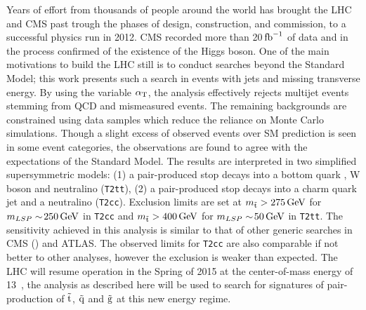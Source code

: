 Years of effort from thousands of people around the world
has brought the LHC and CMS past trough the phases of design, construction,
and commission, to a successful physics run in 2012. CMS recorded more than 
20$\mbox{\ensuremath{\,\text{fb}^\text{$-$1}}}$ of data and in the process confirmed of the existence of the Higgs boson. 
One of the main motivations to build the LHC still is to conduct
searches beyond the Standard Model; this work presents such a search
in events with jets and missing transverse energy. By using the variable $\alpha_{\text{T}}$,
the analysis effectively rejects multijet events stemming from QCD and 
mismeasured events. The remaining backgrounds are constrained using
data samples which reduce the reliance on Monte Carlo simulations. Though
a slight excess of observed events over SM prediction is seen in some event categories, 
the observations are found to agree with the expectations of the Standard Model. 
The results are interpreted in two simplified supersymmetric models: (1) a 
pair-produced stop decays into a bottom quark , W boson and neutralino 
(\texttt{T2tt}), (2) a pair-produced stop decays into a charm quark 
jet and a neutralino (\texttt{T2cc}). 
Exclusion limits are set at $m_{\tilde{\rm t}}>275\,\text{Ge\hspace{-.08em}V}$ for $m_{LSP}\sim\!250\,\text{Ge\hspace{-.08em}V}$ 
in \texttt{T2cc} and $m_{\tilde{\rm t}}>400\,\text{Ge\hspace{-.08em}V}$ for $m_{LSP}\sim\!50\,\text{Ge\hspace{-.08em}V}$ in \texttt{T2tt}. 
The sensitivity achieved in this analysis is similar to that of other 
generic searches in CMS (\cite{CMS-PAS-SUS-14-008,cms-pas-sus-09001})
and ATLAS. The observed limits for \texttt{T2cc} are also comparable 
if not better to other analyses, however the  exclusion is 
weaker than expected. The LHC will resume operation in the Spring of 
2015 at the center-of-mass energy of 13~\TeV, the \alphat 
analysis as described here will be used to search for signatures of 
pair-production of $\tilde{\rm t}$, $\tilde{\rm q}$ and $\tilde{\rm g}$ at this new energy regime.
\clearpage
